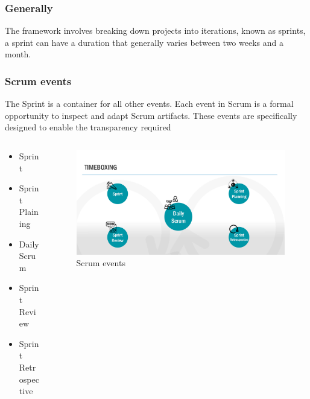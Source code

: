 \documentclass[
	11pt, %
]{beamer}
\begin{document}
\begin{frame}
	\frametitle{Generally} 
	The framework involves breaking down projects into iterations, 
	known as sprints,  a sprint can have a duration 
	that generally varies between two weeks and a month.
\end{frame}


\begin{frame}
	\frametitle{Scrum events}
	The Sprint is a container for all other
	events. Each event in Scrum is a formal
	opportunity to inspect and adapt Scrum 
	artifacts. These events are specifically
	designed to enable the transparency required
	\begin{columns}[c] %
		\begin{column}{0.4\textwidth} %
			\begin{itemize} %
				\item Sprint
				\item Sprint Plaining
				\item Daily Scrum
				\item Sprint Review
				\item Sprint Retrospective
			\end{itemize}
		\end{column}
		\begin{column}{0.7\textwidth} %
			\begin{figure}
				\includegraphics[width=1\linewidth]{events.png}
				\caption{Scrum events}
			\end{figure}
		\end{column}
	\end{columns}
\end{frame}
\end{document}
